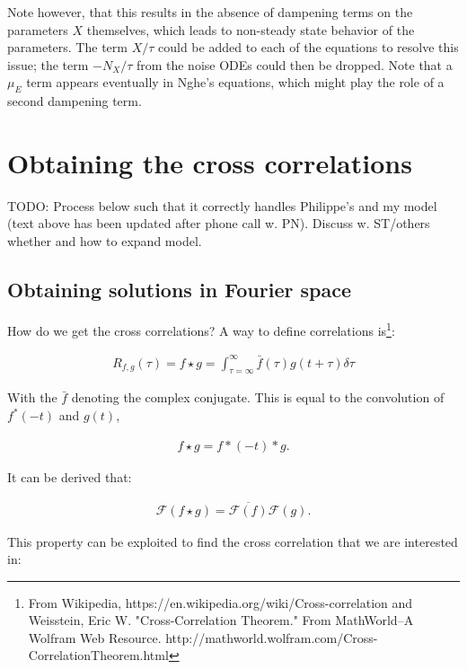 \documentclass[a4paper,twoside,10pt]{report}
\begin{document}
Note however, that this results in the absence of dampening terms on the parameters $X$ themselves, which leads to non-steady state behavior of the parameters.
The term $X/\tau$ could be added to each of the equations to resolve this issue; the term $-N_X/\tau$ from the noise ODEs could then be dropped.
{\color{red}Note that a $\mu_E$ term appears eventually in Nghe's equations, which might play the role of a second dampening term.}




\section{Obtaining the cross correlations}

{\color{red}TODO: Process below such that it correctly handles Philippe's and my model (text above has been updated after phone call w. PN). Discuss w. ST/others whether and how to expand model.}

\subsection{Obtaining solutions in Fourier space}

How do we get the cross correlations? A way to define correlations is\footnote{From Wikipedia, https://en.wikipedia.org/wiki/Cross-correlation and Weisstein, Eric W. "Cross-Correlation Theorem." From MathWorld--A Wolfram Web Resource. http://mathworld.wolfram.com/Cross-CorrelationTheorem.html}:

\begin{align}
R_{f,g}(\tau) = f \star g = \int_{\tau=\infty}^{\infty} {\bar f(\tau) g(t+\tau) \delta \tau}
\end{align}

With the $\bar{f}$ denoting the complex conjugate. This is equal to the convolution of $f^*(-t)$ and $g(t)$, 

\begin{align}
f \star g = f*(-t) * g
.
\end{align}

It can be derived that:

\begin{align}
\mathcal{F} (f \star g) = \overline{\mathcal{F} (f)} \mathcal{F}(g)
.
\end{align}

This property can be exploited to find the cross correlation that we are interested in:
\end{document}
